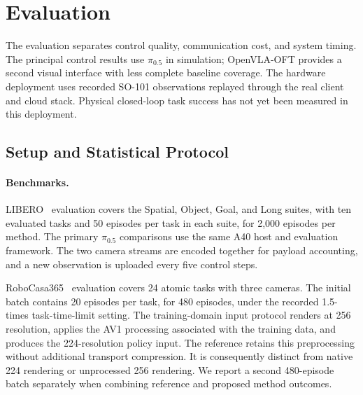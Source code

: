 \section{Evaluation}
\label{sec:evaluation}
The evaluation separates control quality, communication cost, and system
timing. The principal control results use $\pi_{0.5}$ in simulation;
OpenVLA-OFT provides a second visual interface with less complete baseline
coverage. The hardware deployment uses recorded SO-101 observations
replayed through the real client and cloud stack. Physical closed-loop
task success has not yet been measured in this deployment.

\subsection{Setup and Statistical Protocol}

\paragraph{Benchmarks.}
LIBERO~\cite{libero} evaluation covers the Spatial, Object, Goal, and Long
suites, with ten evaluated tasks and 50 episodes per task in each suite,
for 2,000 episodes per method. The primary $\pi_{0.5}$ comparisons use
the same A40 host and evaluation framework. The two camera streams are
encoded together for payload accounting, and a new observation is uploaded
every five control steps.

RoboCasa365~\cite{robocasa365} evaluation covers 24 atomic tasks with
three cameras. The initial batch contains 20 episodes per task, for 480
episodes, under the recorded 1.5-times task-time-limit setting. The
training-domain input protocol renders at 256 resolution, applies the
AV1 processing associated with the training data, and produces the
224-resolution policy input. The reference retains this preprocessing
without additional transport compression. It is consequently distinct
from native 224 rendering or unprocessed 256 rendering. We report a
second 480-episode batch separately when combining reference and proposed
method outcomes.

